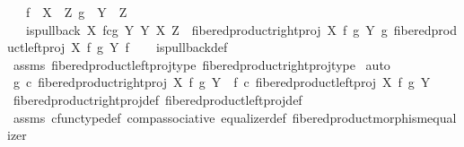 \begin{isabellebody}
\ \ \ {\isachardoublequoteopen}f\ {\isacharcolon}{\kern0pt}\ X\ {\isasymrightarrow}\ Z{\isachardoublequoteclose}\ {\isachardoublequoteopen}g\ {\isacharcolon}{\kern0pt}\ Y\ {\isasymrightarrow}\ Z{\isachardoublequoteclose}\isanewline
\ \ \ {\isachardoublequoteopen}is{\isacharunderscore}{\kern0pt}pullback\ {\isacharparenleft}{\kern0pt}X\ \isactrlbsub f\isactrlesub {\isasymtimes}\isactrlsub c\isactrlbsub g\isactrlesub \ Y{\isacharparenright}{\kern0pt}\ Y\ X\ Z\ \ {\isacharparenleft}{\kern0pt}fibered{\isacharunderscore}{\kern0pt}product{\isacharunderscore}{\kern0pt}right{\isacharunderscore}{\kern0pt}proj\ X\ f\ g\ Y{\isacharparenright}{\kern0pt}\ g\ {\isacharparenleft}{\kern0pt}fibered{\isacharunderscore}{\kern0pt}product{\isacharunderscore}{\kern0pt}left{\isacharunderscore}{\kern0pt}proj\ X\ f\ g\ Y{\isacharparenright}{\kern0pt}\ f{\isachardoublequoteclose}\isanewline
%
\isadelimproof
\ \ %
\endisadelimproof
%
\isatagproof
{}\isamarkupfalse%
\ is{\isacharunderscore}{\kern0pt}pullback{\isacharunderscore}{\kern0pt}def\isanewline
\ \ \isamarkupfalse%
\ assms\ fibered{\isacharunderscore}{\kern0pt}product{\isacharunderscore}{\kern0pt}left{\isacharunderscore}{\kern0pt}proj{\isacharunderscore}{\kern0pt}type\ fibered{\isacharunderscore}{\kern0pt}product{\isacharunderscore}{\kern0pt}right{\isacharunderscore}{\kern0pt}proj{\isacharunderscore}{\kern0pt}type\isanewline
{}\isamarkupfalse%
\ auto\isanewline
\ \ \isamarkupfalse%
\ {\isachardoublequoteopen}g\ {\isasymcirc}\isactrlsub c\ fibered{\isacharunderscore}{\kern0pt}product{\isacharunderscore}{\kern0pt}right{\isacharunderscore}{\kern0pt}proj\ X\ f\ g\ Y\ {\isacharequal}{\kern0pt}\ f\ {\isasymcirc}\isactrlsub c\ fibered{\isacharunderscore}{\kern0pt}product{\isacharunderscore}{\kern0pt}left{\isacharunderscore}{\kern0pt}proj\ X\ f\ g\ Y{\isachardoublequoteclose}\isanewline
\ \ \ \ \isamarkupfalse%
\ fibered{\isacharunderscore}{\kern0pt}product{\isacharunderscore}{\kern0pt}right{\isacharunderscore}{\kern0pt}proj{\isacharunderscore}{\kern0pt}def\ fibered{\isacharunderscore}{\kern0pt}product{\isacharunderscore}{\kern0pt}left{\isacharunderscore}{\kern0pt}proj{\isacharunderscore}{\kern0pt}def\isanewline
\ \ \ \ \isamarkupfalse%
\ assms\ cfunc{\isacharunderscore}{\kern0pt}type{\isacharunderscore}{\kern0pt}def\ comp{\isacharunderscore}{\kern0pt}associative{}\ equalizer{\isacharunderscore}{\kern0pt}def\ fibered{\isacharunderscore}{\kern0pt}product{\isacharunderscore}{\kern0pt}morphism{\isacharunderscore}{\kern0pt}equalizer\isanewline

\end{isabellebody}
